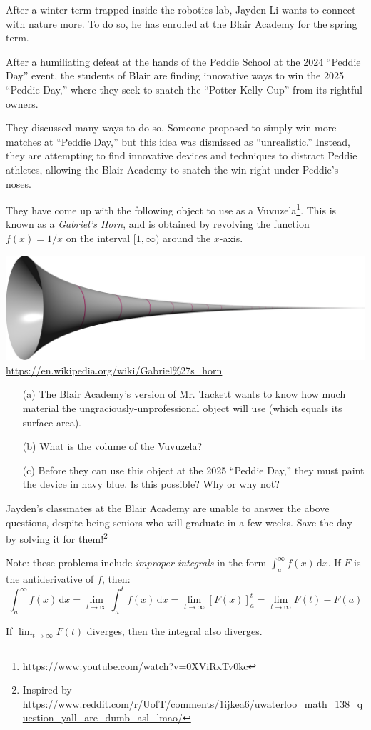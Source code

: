 \documentclass{article}
\begin{document}
After a winter term trapped inside the robotics lab, Jayden Li wants to connect with nature more. To do so, he has enrolled at the Blair Academy for the spring term.

After a humiliating defeat at the hands of the Peddie School at the 2024 ``Peddie Day'' event, the students of Blair are finding innovative ways to win the 2025 ``Peddie Day,'' where they seek to snatch the ``Potter-Kelly Cup'' from its rightful owners.

They discussed many ways to do so. Someone proposed to simply win more matches at ``Peddie Day,'' but this idea was dismissed as ``unrealistic.'' Instead, they are attempting to find innovative devices and techniques to distract Peddie athletes, allowing the Blair Academy to snatch the win right under Peddie's noses.

They have come up with the following object to use as a Vuvuzela\footnote{\url{https://www.youtube.com/watch?v=0XViRxTv0kc}}. This is known as a \textit{Gabriel's Horn}, and is obtained by revolving the function $f(x)=1/x$ on the interval $[1,\infty)$ around the $x$-axis.

\begin{center}
	\includegraphics[width=0.8\linewidth]{GabrielHorn.png}
	\url{https://en.wikipedia.org/wiki/Gabriel%27s_horn}
\end{center}

\begin{itemize}[topsep=0pt]
	\item[(a)] The Blair Academy's version of Mr. Tackett wants to know how much material the ungraciously-unprofessional object will use (which equals its surface area).
	\item[(b)] What is the volume of the Vuvuzela?
	\item[(c)] Before they can use this object at the 2025 ``Peddie Day,'' they must paint the device in navy blue. Is this possible? Why or why not?
\end{itemize}

Jayden's classmates at the Blair Academy are unable to answer the above questions, despite being seniors who will graduate in a few weeks. Save the day by solving it for them!\footnote{Inspired by \url{https://www.reddit.com/r/UofT/comments/1ijkea6/uwaterloo_math_138_question_yall_are_dumb_asl_lmao/}}

Note: these problems include \textit{improper integrals} in the form $\displaystyle \int_{a}^{\infty}f(x)\,\mathrm{d}x$. If $F$ is the antiderivative of $f$, then:
\begin{equation*}
    \int_{a}^{\infty}f(x)\,\mathrm{d}x
	=\lim_{t\to\infty}\int_{a}^{t}f(x)\,\mathrm{d}x
	=\lim_{t\to\infty}\left[F(x)\right]_{a}^{t}
	=\lim_{t\to\infty}F(t)-F(a)
\end{equation*}

If $\lim_{t\to\infty}F(t)$ diverges, then the integral also diverges.
\end{document}
